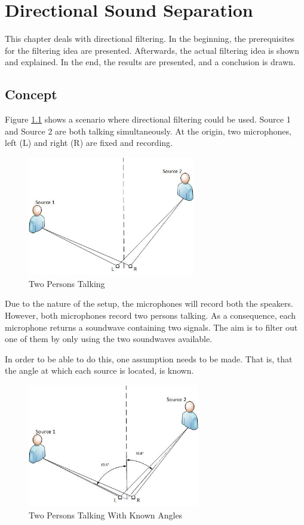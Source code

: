 \chapter{Directional Sound Separation}\label{ch:directional}
This chapter deals with directional filtering. In the beginning, the prerequisites for 
the filtering idea are presented. Afterwards, the actual filtering idea is shown and explained.
In the end, the results are presented, and a conclusion is drawn.
\section{Concept}
Figure \ref{fig:2sources} shows a scenario where directional filtering could be used.
Source 1 and Source 2 are both talking simultaneously. At the origin, two microphones,
left (L) and right (R) are fixed and recording.

\begin{figure}[htp]
	\centering
	\includegraphics[width=0.65\textwidth]{Illustrations/2sources.jpg}
	\caption{Two Persons Talking}
	\label{fig:2sources}
\end{figure}

Due to the nature of the setup, the microphones will record  both the speakers.
However, both microphones record two persons talking. As a consequence, each microphone
returns a soundwave containing two signals. The aim is to filter out one of them
by only using the two soundwaves available.

In order to be able to do this, one assumption needs to be made. That is, that the 
angle at which each source is located, is known.

\begin{figure}[htp]
	\centering
	\includegraphics[width=0.67\textwidth]{Illustrations/2sourcesWangles.jpg}
	\caption{Two Persons Talking With Known Angles}
	\label{fig:2sourcesWangles}
\end{figure}

